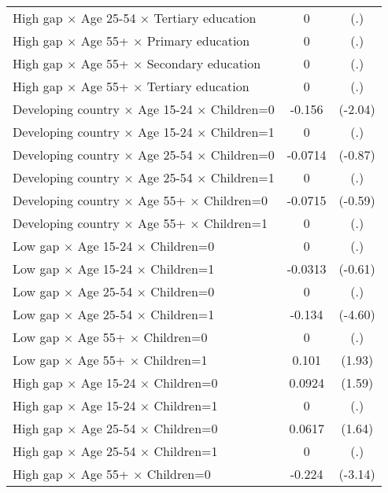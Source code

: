 {\begin{longtable}{l*{1}{cc}}
High gap $\times$ Age 25-54 $\times$ Tertiary education&           0         &         (.)\\
High gap $\times$ Age 55+ $\times$ Primary education&           0         &         (.)\\
High gap $\times$ Age 55+ $\times$ Secondary education&           0         &         (.)\\
High gap $\times$ Age 55+ $\times$ Tertiary education&           0         &         (.)\\
Developing country $\times$ Age 15-24 $\times$ Children=0&      -0.156\sym{*}  &     (-2.04)\\
Developing country $\times$ Age 15-24 $\times$ Children=1&           0         &         (.)\\
Developing country $\times$ Age 25-54 $\times$ Children=0&     -0.0714         &     (-0.87)\\
Developing country $\times$ Age 25-54 $\times$ Children=1&           0         &         (.)\\
Developing country $\times$ Age 55+ $\times$ Children=0&     -0.0715         &     (-0.59)\\
Developing country $\times$ Age 55+ $\times$ Children=1&           0         &         (.)\\
Low gap $\times$ Age 15-24 $\times$ Children=0&           0         &         (.)\\
Low gap $\times$ Age 15-24 $\times$ Children=1&     -0.0313         &     (-0.61)\\
Low gap $\times$ Age 25-54 $\times$ Children=0&           0         &         (.)\\
Low gap $\times$ Age 25-54 $\times$ Children=1&      -0.134\sym{***}&     (-4.60)\\
Low gap $\times$ Age 55+ $\times$ Children=0&           0         &         (.)\\
Low gap $\times$ Age 55+ $\times$ Children=1&       0.101         &      (1.93)\\
High gap $\times$ Age 15-24 $\times$ Children=0&      0.0924         &      (1.59)\\
High gap $\times$ Age 15-24 $\times$ Children=1&           0         &         (.)\\
High gap $\times$ Age 25-54 $\times$ Children=0&      0.0617         &      (1.64)\\
High gap $\times$ Age 25-54 $\times$ Children=1&           0         &         (.)\\
High gap $\times$ Age 55+ $\times$ Children=0&      -0.224\sym{**} &     (-3.14)\\

\end{longtable}}
